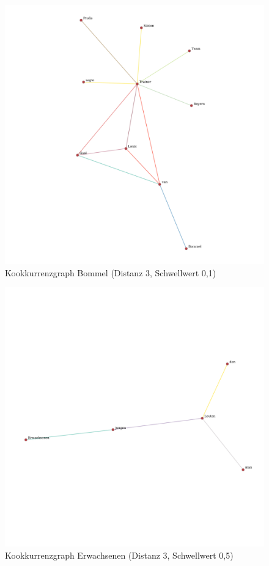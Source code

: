 \documentclass[11pt, a4paper]{article}
\begin{document}
\begin{figure}[hp!]
    \centering
        \includegraphics[scale=.4]{../../data/results/longpath_wordgraphs/den/graph_Bommel.pdf}
    \caption{Kookkurrenzgraph Bommel (Distanz 3, Schwellwert 0,1)}
    \label{fig:lp-bommel}
\end{figure}

\begin{figure}[hp!]
    \centering
        \includegraphics[scale=.4]{../../data/results/longpath_wordgraphs/den/graph_Erwachsenen.pdf}
    \caption{Kookkurrenzgraph Erwachsenen (Distanz 3, Schwellwert 0,5)}
    \label{fig:lp-erwachsenen}
\end{figure}
\end{document}
